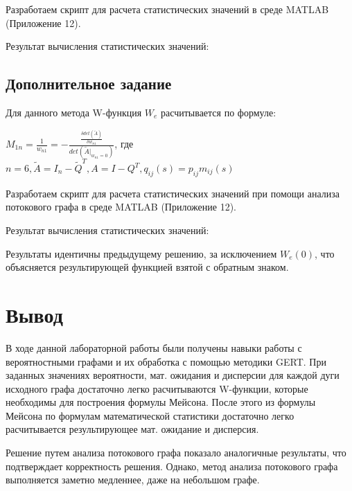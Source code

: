 Разработаем скрипт для расчета статистических значений в среде MATLAB (Приложение 12).

Результат вычисления статистических значений:



\subsection{Дополнительное задание}

Для данного метода W-функция $W_e$ расчитывается по формуле:

$M_{1n}=\frac{1}{w_{n1}}=-\frac{\frac{\delta det(\tilde{A})}{\delta w_{n1}}}{det(\tilde{A}|_{w_{n1}=0})}$, где\\

$n=6,\tilde{A}=I_n-\tilde{Q}^T,A=I-Q^T,q_{ij}(s)=p_{ij}m_{ij}(s)$

Разработаем скрипт для расчета статистических значений при помощи анализа потокового графа в среде MATLAB (Приложение 12).

Результат вычисления статистических значений:



Результаты идентичны предыдущему решению, за исключением $W_e(0)$, что объясняется результирующей функцией взятой с обратным знаком.

\section{Вывод}

В ходе данной лабораторной работы были получены навыки работы с вероятностными графами и их обработка с помощью методики GERT. При заданных значениях вероятности, мат. ожидания и дисперсии для каждой дуги исходного графа достаточно легко расчитываются W-функции, которые необходимы для построения формулы Мейсона. После этого из формулы Мейсона по формулам математической статистики достаточно легко расчитывается результирующее мат. ожидание и дисперсия.

Решение путем анализа потокового графа показало аналогичные результаты, что подтверждает корректность решения. Однако, метод анализа потокового графа выполняется заметно медленнее, даже на небольшом графе.